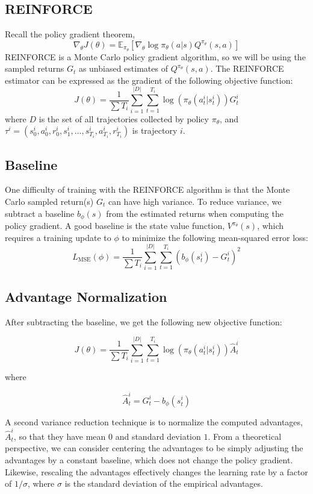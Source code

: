 \documentclass{article}
\begin{document}
\subsection{REINFORCE}
Recall the policy gradient theorem,
\[ \nabla_\theta J(\theta) = \mathbb E_{\pi_\theta} \left[ \nabla_\theta \log\pi_\theta(a|s) Q^{\pi_\theta} (s,a) \right] \]
REINFORCE is a Monte Carlo policy gradient algorithm, so we will be using the sampled returns $G_t$ as unbiased estimates of $Q^{\pi_\theta}(s,a)$. 
The REINFORCE estimator can be expressed as the gradient of the following objective function:
\[ J(\theta) = \frac{1}{\sum T_i} \sum_{i=1}^{|D|} \sum_{t=1}^{T_i} \log(\pi_\theta(a^i_t|s^i_t)) G^i_t \]
where $D$ is the set of all trajectories collected by policy $\pi_\theta$, and $\tau^i =(s^i_0, a^i_0, r^i_0, s^i_1, \dots, s^i_{T_i}, a^i_{T_i}, r^i_{T_i})$ is trajectory $i$.

\subsection{Baseline}
One difficulty of training with the REINFORCE algorithm is that the Monte Carlo sampled return(s) $G_t$ can have high variance. To reduce variance, we subtract a baseline $b_{\phi}(s)$ from the estimated returns when computing the policy gradient. A good baseline is the state value function, $V^{\pi_\theta}(s)$, which requires a training update to $\phi$ to minimize the following mean-squared error loss:
\[ L_{\text{MSE}}(\phi) = \frac{1}{\sum T_i} \sum_{i=1}^{|D|} \sum_{t=1}^{T_i} (b_{\phi}(s^i_t) - G^i_t)^2\]
\subsection{Advantage Normalization}

After subtracting the baseline, we get the following new objective function:

\[ J(\theta) = \frac{1}{\sum T_i} \sum_{i=1}^{|D|} \sum_{t=1}^{T_i} \log(\pi_\theta(a^i_t|s^i_t)) \hat{A}^i_t \]

where

\[\hat{A}^i_t = G^i_t - b_{\phi}(s^i_t)\]

A second variance reduction technique is to normalize the computed advantages, $\hat{A}^i_t$, so that they have mean $0$ and standard deviation $1$. From a theoretical perspective, we can consider centering the advantages to be simply adjusting the advantages by a constant baseline, which does not change the policy gradient. Likewise, rescaling the advantages effectively changes the learning rate by a factor of $1/\sigma$, where $\sigma$ is the standard deviation of the empirical advantages.
\end{document}
